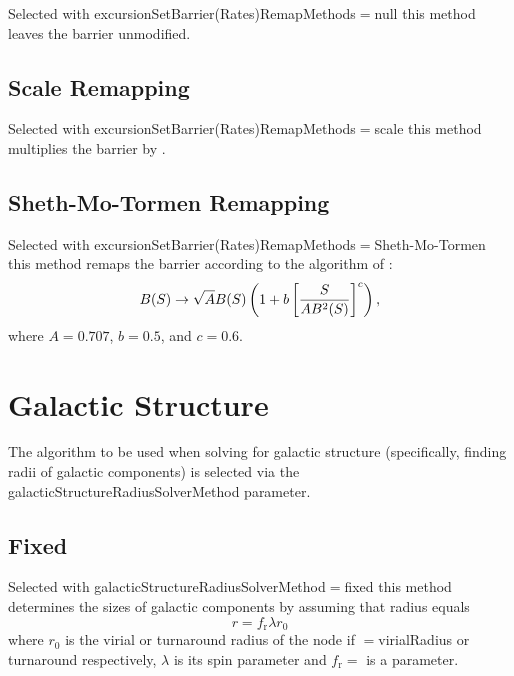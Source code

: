 Selected with {\normalfont \ttfamily excursionSetBarrier(Rates)RemapMethods}$=${\normalfont \ttfamily null} this method leaves the barrier unmodified.

\subsection{Scale Remapping}

Selected with {\normalfont \ttfamily excursionSetBarrier(Rates)RemapMethods}$=${\normalfont \ttfamily scale} this method multiplies the barrier by {\normalfont \ttfamily [excursionSetBarrierRemapScalingFactor]}.

\subsection{Sheth-Mo-Tormen Remapping}

Selected with {\normalfont \ttfamily excursionSetBarrier(Rates)RemapMethods}$=${\normalfont \ttfamily Sheth-Mo-Tormen} this method remaps the barrier according to the algorithm of \cite{sheth_ellipsoidal_2001}:
\begin{equation}
 B(S) \rightarrow \sqrt{A} B(S) \left(1 + b \left[ {S \over A B^2(S)}\right]^c\right),
\end{equation}
where $A=0.707$, $b=0.5$, and $c=0.6$.

\section{Galactic Structure}\label{phys:galacticStructureRadiusSolver}

The algorithm to be used when solving for galactic structure (specifically, finding radii of galactic components) is selected via the {\normalfont \ttfamily galacticStructureRadiusSolverMethod} parameter.

\subsection{Fixed}

Selected with {\normalfont \ttfamily galacticStructureRadiusSolverMethod}$=${\normalfont \ttfamily fixed} this method determines the sizes of galactic components by assuming that radius equals
\begin{equation}
 r = f_{\mathrm r} \lambda r_0
\end{equation}
where $r_0$ is the virial or turnaround radius of the \gls{node} if {\normalfont \ttfamily [galacticStructureRadiiFixedRadius]}$=${\normalfont \ttfamily virialRadius} or {\normalfont \ttfamily turnaround} respectively, $\lambda$ is its spin parameter and $f_{\mathrm r}=${\normalfont \ttfamily [galacticStructureRadiiFixedFactor]} is a parameter.

